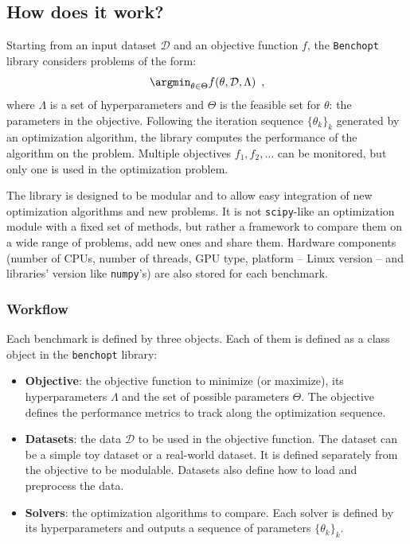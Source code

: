 \subsection{How does it work?}
\label{sub:benchopt_how}

Starting from an input dataset $\mathcal{D}$ and an objective function $f$, the \texttt{Benchopt} library considers problems of the form:
\[
\argmin_{\theta\in\Theta} f(\theta, \mathcal{D},\Lambda) \enspace,
\]
where $\Lambda$ is a set of hyperparameters and $\Theta$ is the feasible set for $\theta$: the parameters in the objective.
Following the iteration sequence $\{\theta_k\}_k$ generated by an optimization algorithm, the library computes the performance of the algorithm on the problem.
Multiple objectives $f_1,f_2,\dots$ can be monitored, but only one is used in the optimization problem.

The library is designed to be modular and to allow easy integration of new optimization algorithms and new problems.
It is not \texttt{scipy}-like an optimization module with a fixed set of methods, but rather a framework to compare them on a wide range of problems, add new ones and share them.
Hardware components (number of CPUs, number of threads, GPU type, platform -- Linux version -- and libraries' version like \texttt{numpy}'s) are also stored for each benchmark.

\subsubsection{Workflow}

Each benchmark is defined by three objects. Each of them is defined as a class object in the \texttt{benchopt} library:
\begin{itemize}
    \item \textbf{Objective}: the objective function to minimize (or maximize), its hyperparameters $\Lambda$ and the set of possible parameters $\Theta$. The objective defines the performance metrics to track along the optimization sequence.
    \item \textbf{Datasets}: the data $\mathcal{D}$ to be used in the objective function. The dataset can be a simple toy dataset or a real-world dataset. It is defined separately from the objective to be modulable.
    Datasets also define how to load and preprocess the data.
    \item \textbf{Solvers}: the optimization algorithms to compare. Each solver is defined by its hyperparameters and outputs a sequence of parameters $\{\theta_k\}_k$.
\end{itemize}


